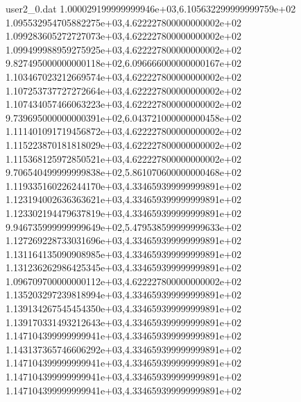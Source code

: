 \begin{filecontents}{user2_0.dat}
1.000029199999999946e+03,6.105632299999999759e+02
1.095532954705882275e+03,4.622227800000000002e+02
1.099283605272727073e+03,4.622227800000000002e+02
1.099499988959275925e+03,4.622227800000000002e+02
9.827495000000000118e+02,6.096666000000000167e+02
1.103467023212669574e+03,4.622227800000000002e+02
1.107253737727272664e+03,4.622227800000000002e+02
1.107434057466063223e+03,4.622227800000000002e+02
9.739695000000000391e+02,6.043721000000000458e+02
1.111401091719456872e+03,4.622227800000000002e+02
1.115223870181818029e+03,4.622227800000000002e+02
1.115368125972850521e+03,4.622227800000000002e+02
9.706540499999999838e+02,5.861070600000000468e+02
1.119335160226244170e+03,4.334659399999999891e+02
1.123194002636363621e+03,4.334659399999999891e+02
1.123302194479637819e+03,4.334659399999999891e+02
9.946735999999999649e+02,5.479538599999999633e+02
1.127269228733031696e+03,4.334659399999999891e+02
1.131164135090908985e+03,4.334659399999999891e+02
1.131236262986425345e+03,4.334659399999999891e+02
1.096709700000000112e+03,4.622227800000000002e+02
1.135203297239818994e+03,4.334659399999999891e+02
1.139134267545454350e+03,4.334659399999999891e+02
1.139170331493212643e+03,4.334659399999999891e+02
1.147104399999999941e+03,4.334659399999999891e+02
1.143137365746606292e+03,4.334659399999999891e+02
1.147104399999999941e+03,4.334659399999999891e+02
1.147104399999999941e+03,4.334659399999999891e+02
1.147104399999999941e+03,4.334659399999999891e+02
\end{filecontents}